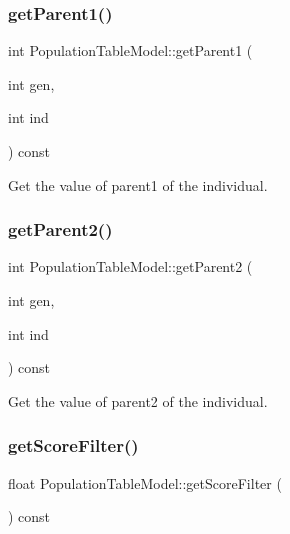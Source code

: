 \mbox{\label{class_population_table_model_aa64e2a825ef14aeb8f28ec6fe47af7ee}} 
\subsubsection{\texorpdfstring{get\+Parent1()}{getParent1()}}
{\footnotesize\ttfamily int Population\+Table\+Model\+::get\+Parent1 (\begin{DoxyParamCaption}\item[{int}]{gen,  }\item[{int}]{ind }\end{DoxyParamCaption}) const}



Get the value of parent1 of the individual. 

\mbox{\label{class_population_table_model_afc593da9807c8075c8a86950a77c0f34}} 
\subsubsection{\texorpdfstring{get\+Parent2()}{getParent2()}}
{\footnotesize\ttfamily int Population\+Table\+Model\+::get\+Parent2 (\begin{DoxyParamCaption}\item[{int}]{gen,  }\item[{int}]{ind }\end{DoxyParamCaption}) const}



Get the value of parent2 of the individual. 

\mbox{\label{class_population_table_model_a2972b6a98b83d15ce54e968b93f4d641}} 
\subsubsection{\texorpdfstring{get\+Score\+Filter()}{getScoreFilter()}}
{\footnotesize\ttfamily float Population\+Table\+Model\+::get\+Score\+Filter (\begin{DoxyParamCaption}{ }\end{DoxyParamCaption}) const}



